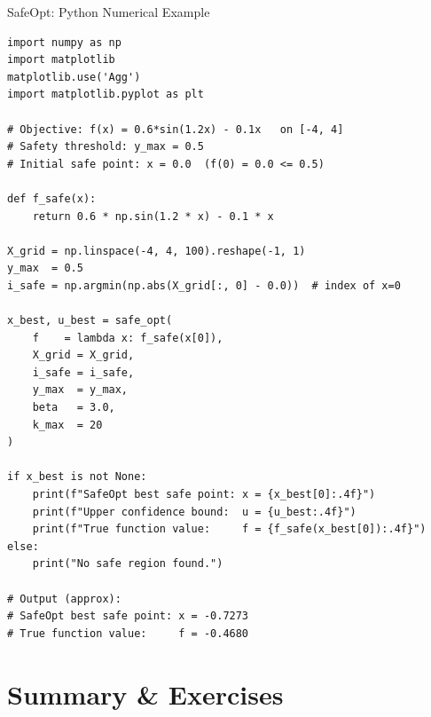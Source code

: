 \documentclass[aspectratio=169,10pt]{beamer}
\begin{document}
\begin{frame}[fragile]{SafeOpt: Python Numerical Example}
\begin{lstlisting}[caption={Running SafeOpt on a simple 1-D problem}]
import numpy as np
import matplotlib
matplotlib.use('Agg')
import matplotlib.pyplot as plt

# Objective: f(x) = 0.6*sin(1.2x) - 0.1x   on [-4, 4]
# Safety threshold: y_max = 0.5
# Initial safe point: x = 0.0  (f(0) = 0.0 <= 0.5)

def f_safe(x):
    return 0.6 * np.sin(1.2 * x) - 0.1 * x

X_grid = np.linspace(-4, 4, 100).reshape(-1, 1)
y_max  = 0.5
i_safe = np.argmin(np.abs(X_grid[:, 0] - 0.0))  # index of x=0

x_best, u_best = safe_opt(
    f    = lambda x: f_safe(x[0]),
    X_grid = X_grid,
    i_safe = i_safe,
    y_max  = y_max,
    beta   = 3.0,
    k_max  = 20
)

if x_best is not None:
    print(f"SafeOpt best safe point: x = {x_best[0]:.4f}")
    print(f"Upper confidence bound:  u = {u_best:.4f}")
    print(f"True function value:     f = {f_safe(x_best[0]):.4f}")
else:
    print("No safe region found.")

# Output (approx):
# SafeOpt best safe point: x = -0.7273
# True function value:     f = -0.4680
\end{lstlisting}
\end{frame}

\section{Summary \& Exercises}
\end{document}
